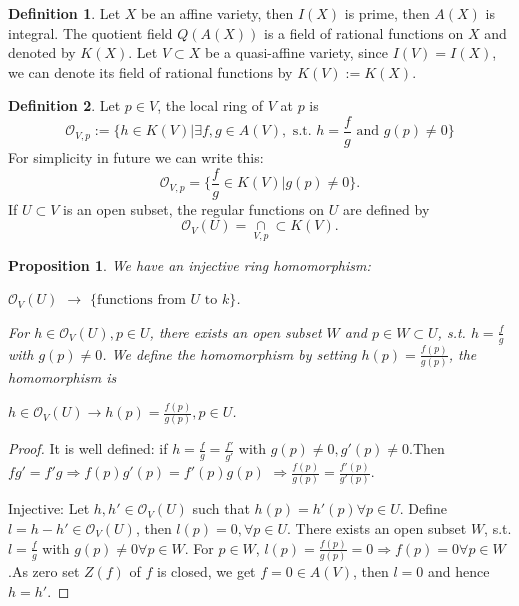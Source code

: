 \documentclass{amsart}
\theoremstyle{plain}
\newtheorem{proposition}{Proposition}
\theoremstyle{definition}
\newtheorem{definition}{Definition}
\theoremstyle{remark}
\numberwithin{equation}{section}
\begin{document}
 \begin{definition}
 	Let $ X $ be an affine variety, then $ I(X) $ is prime, then $ A(X) $ is integral.
 	The quotient field $ Q(A(X)) $ is a field of rational functions on $ X $ and denoted by $ K(X) $. Let $ V\subset X $ be a quasi-affine variety, since $ I(V)=I(X) $, we can denote its field of rational functions by $ K(V):=K(X) $.
 \end{definition}
 \begin{definition}
 	Let $ p\in V $, the local ring of $ V $ at $ p $ is
 	\begin{equation}
 	\mathcal{O}_{V,p}:=\{h \in K(V)|\exists f,g\in A(V), \text{ s.t. } h=\frac{f}{g} \text{ and } g(p)\neq 0 \}
 	\end{equation}
 	For simplicity in future we can write this:
 	\begin{equation}
 	\mathcal{O}_{V,p}=\{ \frac{f}{g}\in K(V)|g(p)\neq 0 \}.
 	\end{equation}
 	If $ U\subset V $ is an open subset, the regular functions on $ U $ are defined by
 	\begin{equation}
 	\mathcal{O}_V(U)=\mathop{\cap}\limits_{V,p}\subset K(V).
 	\end{equation}
 \end{definition}
 \begin{proposition}
 	We have an injective ring homomorphism:\begin{center}
 		$ \mathcal{O}_V(U) $ $ \to $ $ \{ \text{functions from }U \text{ to } k \} $.
 	\end{center}
 	For $ h\in \mathcal{O}_V(U),p\in U $, there exists an open subset $ W $ and $ p\in W\subset U $, s.t. $ h=\frac{f}{g} $ with $ g(p)\neq 0 $. We define the homomorphism by setting $ h(p)=\frac{f(p)}{g(p)} $, the homomorphism is
 	\begin{center}
 		$ h\in \mathcal{O}_V(U)\to h(p)=\frac{f(p)}{g(p)}, p\in U $.
 	\end{center}
 \end{proposition}
 \begin{proof}
 	It is well defined: if $ h=\frac{f}{g}=\frac{f'}{g'} $ with $ g(p)\neq 0,g'(p)\neq 0 $.Then $ fg'=f'g \Rightarrow f(p)g'(p)=f'(p)g(p)$ $ \Rightarrow \frac{f(p)}{g(p)}=\frac{f'(p)}{g'(p)} $.
 	
 	Injective: Let $ h,h'\in \mathcal{O}_V(U) $ such that $ h(p)=h'(p) \forall p\in U$.
 	Define $ l=h-h'\in \mathcal{O}_V(U) $, then $ l(p)=0 ,\forall p\in U$. There exists an open subset $ W $, s.t. $ l=\frac{f}{g} $ with $ g(p)\neq 0 \forall p\in W $. For $ p\in W $, $ l(p)=\frac{f(p)}{g(p)}=0\Rightarrow f(p)=0 \forall p\in W $.As zero set $ Z(f) $ of $ f $ is closed, we get $ f=0\in A(V) $, then $ l=0 $ and hence $ h=h' $.
 \end{proof}
\end{document}
